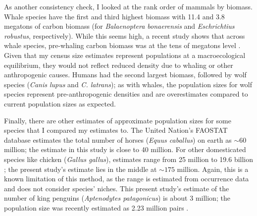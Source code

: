 \documentclass[11pt]{article}
\begin{document}
As another consistency check, I looked at the rank order of mammals by biomass.
Whale species have the first and third highest biomass with 11.4 and 3.8
megatons of carbon biomass (for \emph{Balaenoptera bonaerensis} and
\emph{Eschrichtius robustus}, respectively). While this seems high, a recent
study shows that across whale species, pre-whaling carbon biomass was at the
tens of megatons level \parencite[Table 1 and Figure 1]{Pershing2010-fh}.
Given that my census size estimates represent populations at a macroecological
equilibrium, they would not reflect reduced density due to whaling or other
anthropogenic causes. Humans had the second largest biomass, followed by wolf
species (\emph{Canis lupus} and \emph{C. latrans}); as with whales, the
population sizes for wolf species represent pre-anthropogenic densities and are
overestimates compared to current population sizes as expected. 

Finally, there are other estimates of approximate population sizes for some
species that I compared my estimates to. The United Nation's FAOSTAT database
estimates the total number of horses (\emph{Equus caballus}) on earth as
$\mathord{\sim}60$ million; the estimate in this study is close to 40 million.
For other domesticated species like chicken (\emph{Gallus gallus}), estimates
range from 25 million to 19.6 billion
\parencite{noauthor_2021-gc,Robinson2014-sx}; the present study's estimate lies
in the middle at $\mathord{\sim}175$ million. Again, this is a known limitation
of this method, as the range is estimated from occurrence data and does not
consider species' niches. This present study's estimate of the number of king
penguins (\emph{Aptenodytes patagonicus}) is about 3 million; the population
size was recently estimated as 2.23 million pairs \parencite{Shirihai2008-ft}.
\end{document}

